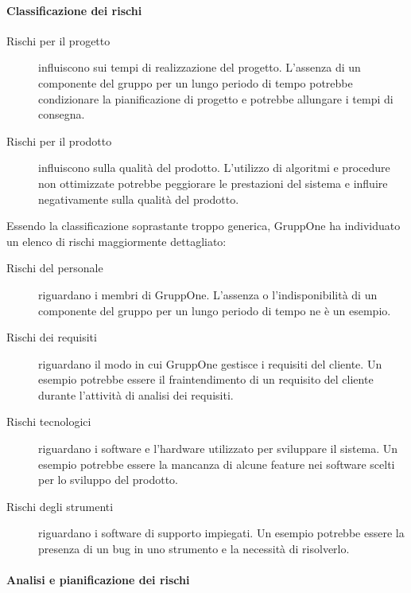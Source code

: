 \documentclass[../../norme-di-progetto.tex]{subfiles}
\begin{document}
\paragraph{Classificazione dei rischi}%
\label{par:classificazione_dei_rischi}
\begin{description}
  \item [Rischi per il progetto] influiscono sui tempi di realizzazione del progetto. L'assenza di un componente del gruppo per un lungo periodo di tempo potrebbe condizionare la pianificazione di progetto e potrebbe allungare i tempi di consegna.
  \item [Rischi per il prodotto] influiscono sulla qualità del prodotto. L'utilizzo di algoritmi e procedure non ottimizzate potrebbe peggiorare le prestazioni del sistema e influire negativamente sulla qualità del prodotto.
\end{description}
Essendo la classificazione soprastante troppo generica, GruppOne ha individuato un elenco di rischi maggiormente dettagliato:
\begin{description}
  \item [Rischi del personale] riguardano i membri di GruppOne. L'assenza o l'indisponibilità di un componente del gruppo per un lungo periodo di tempo ne è un esempio.
  \item [Rischi dei requisiti] riguardano il modo in cui GruppOne gestisce i requisiti del cliente. Un esempio potrebbe essere il fraintendimento di un requisito del cliente durante l'attività di analisi dei requisiti.
  \item [Rischi tecnologici] riguardano i software e l'hardware utilizzato per sviluppare il sistema. Un esempio potrebbe essere la mancanza di alcune feature nei software scelti per lo sviluppo del prodotto.
  \item [Rischi degli strumenti] riguardano i software di supporto impiegati. Un esempio potrebbe essere la presenza di un bug in uno strumento e la necessità di risolverlo.
\end{description}

\paragraph{Analisi e pianificazione dei rischi}%
\label{par:analisi_e_pianificazione_dei_rischi}
\end{document}

